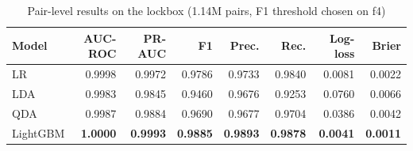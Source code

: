 \begin{table}[t]
\centering
\footnotesize
\caption{Pair-level results on the lockbox (1.14M pairs, F1 threshold chosen on f4)}
\label{tab:pairs}
\begin{tabular}{lrrrrrrr}
\toprule
Model & AUC-ROC & PR-AUC & F1 & Prec. & Rec. & Log-loss & Brier \\
\midrule
LR & 0.9998 & 0.9972 & 0.9786 & 0.9733 & 0.9840 & 0.0081 & 0.0022 \\
LDA & 0.9983 & 0.9845 & 0.9460 & 0.9676 & 0.9253 & 0.0760 & 0.0066 \\
QDA & 0.9987 & 0.9884 & 0.9690 & 0.9677 & 0.9704 & 0.0386 & 0.0042 \\
LightGBM & \textbf{1.0000} & \textbf{0.9993} & \textbf{0.9885} & \textbf{0.9893} & \textbf{0.9878} & \textbf{0.0041} & \textbf{0.0011} \\
\bottomrule
\end{tabular}
\end{table}
